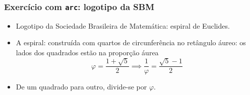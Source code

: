 \begin{frame}
  \frametitle{Exercício com \texttt{arc}: logotipo da SBM}

  \begin{itemize}
  \item Logotipo da Sociedade Brasileira de Matemática: espiral de Euclides.
    
    \begin{center}
    \end{center}

  \item A espiral: construída com quartos de circunferência no
    retângulo áureo: os lados dos quadrados estão na proporção áurea
    \[
    \varphi= \frac{1+\sqrt5}{2} \implies \frac{1}{\varphi}=\frac{\sqrt5-1}{2}
    \]

  \item De um quadrado para outro, divide-se por $\varphi$.
  \end{itemize}
\end{frame}

